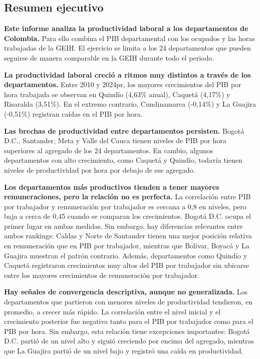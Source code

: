 \documentclass[12pt, a4paper]{article}
\begin{document}
\begin{mdframed}[
  linewidth=1pt,
  linecolor=gray!60,
  backgroundcolor=gray!6,
  innertopmargin=12pt,
  innerbottommargin=12pt,
  innerleftmargin=14pt,
  innerrightmargin=14pt
]
\section*{Resumen ejecutivo}
\textbf{Este informe analiza la productividad laboral a los departamentos de Colombia.} Para ello combina el PIB departamental con los ocupados y las horas trabajadas de la GEIH. El ejercicio se limita a los 24 departamentos que pueden seguirse de manera comparable en la GEIH durante todo el periodo.

\textbf{La productividad laboral creció a ritmos muy distintos a través de los departamentos.} Entre 2010 y 2024pr, los mayores crecimientos del PIB por hora trabajada se observan en Quindío (4,63\% anual), Caquetá (4,17\%) y Risaralda (3,51\%). En el extremo contrario, Cundinamarca (-0,14\%) y La Guajira (-0,51\%) registran caídas en el PIB por hora.

\textbf{Las brechas de productividad entre departamentos persisten.} Bogotá D.C., Santander, Meta y Valle del Cauca tienen niveles de PIB por hora superiores al agregado de los 24 departamentos. En cambio, algunos departamentos con alto crecimiento, como Caquetá y Quindío, todavía tienen niveles de productividad por hora por debajo de ese agregado.

\textbf{Los departamentos más productivos tienden a tener mayores remuneraciones, pero la relación no es perfecta.} La correlación entre PIB por trabajador y remuneración por trabajador es cercana a 0,8 en niveles, pero baja a cerca de 0,45 cuando se comparan los crecimientos. Bogotá D.C. ocupa el primer lugar en ambas medidas. Sin embargo, hay diferencias relevantes entre ambos rankings: Caldas y Norte de Santander tienen una mejor posición relativa en remuneración que en PIB por trabajador, mientras que Bolívar, Boyacá y La Guajira muestran el patrón contrario. Además, departamentos como Quindío y Caquetá registraron crecimientos muy altos del PIB por trabajador sin ubicarse entre los mayores crecimientos de remuneración por trabajador.

\textbf{Hay señales de convergencia descriptiva, aunque no generalizada.} Los departamentos que partieron con menores niveles de productividad tendieron, en promedio, a crecer más rápido. La correlación entre el nivel inicial y el crecimiento posterior fue negativa tanto para el PIB por trabajador como para el PIB por hora. Sin embargo, esta relación tiene excepciones importantes: Bogotá D.C. partió de un nivel alto y siguió creciendo por encima del agregado, mientras que La Guajira partió de un nivel bajo y registró una caída en productividad.


\end{mdframed}
\end{document}
